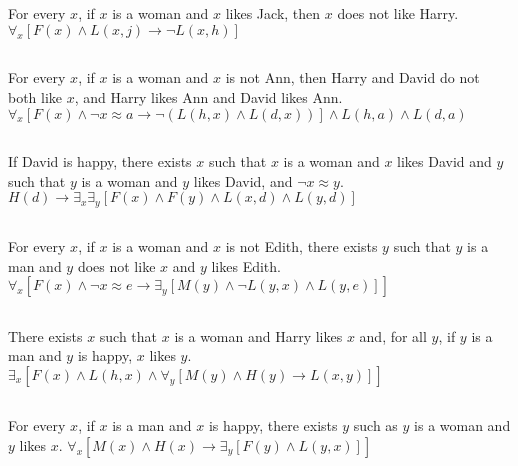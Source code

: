 \documentclass{article}
\begin{document}
\subsection{}
For every $x$, if $x$ is a woman and $x$ likes Jack, then $x$ does not like Harry.
\newline
$\forall_x[F(x) \wedge L(x, j) \to \neg L(x, h)]$

\subsection{}
For every $x$, if $x$ is a woman and $x$ is not Ann, then Harry and David do not both like $x$, and Harry likes Ann and David likes Ann.
\newline
$\forall_x[F(x) \wedge \neg x \approx a \to \neg (L(h, x) \wedge L(d, x))] \wedge L(h, a) \wedge L(d, a)$

\subsection{}
If David is happy, there exists $x$ such that $x$ is a woman and $x$ likes David and $y$ such that $y$ is a woman and $y$ likes David, and $\neg x \approx y$.
\newline
$H(d) \to \exists_x \exists_y[F(x) \wedge F(y) \wedge L(x, d) \wedge L(y, d)]$

\subsection{}
For every $x$, if $x$ is a woman and $x$ is not Edith, there exists $y$ such that $y$ is a man and $y$ does not like $x$ and $y$ likes Edith.
\newline
$\forall_x[F(x) \wedge \neg x \approx e \to \exists_y[M(y) \wedge \neg L(y, x) \wedge L(y, e)]]$

\subsection{}
There exists $x$ such that $x$ is a woman and Harry likes $x$ and, for all $y$, if $y$ is a man and $y$ is happy, $x$ likes $y$.
\newline
$\exists_x[F(x) \wedge L(h, x) \wedge \forall_y[M(y) \wedge H(y) \to L(x, y)]]$

\subsection{}
For every $x$, if $x$ is a man and $x$ is happy, there exists $y$ such as $y$ is a woman and $y$ likes $x$.
\newline
$\forall_x[M(x) \wedge H(x) \to \exists_y[F(y) \wedge L(y, x)]]$
\end{document}
